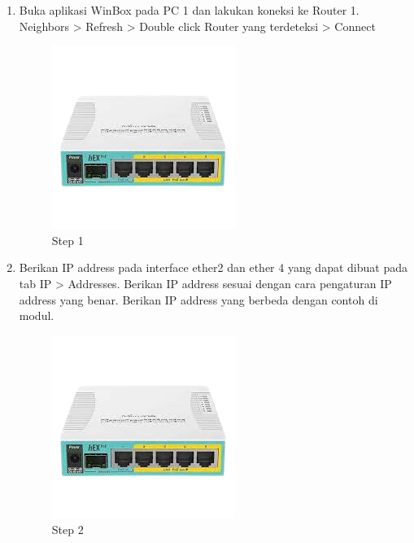 \begin{enumerate}
	\item Buka aplikasi WinBox pada PC 1 dan lakukan koneksi ke Router 1. Neighbors > Refresh >
	Double click Router yang terdeteksi > Connect
	\begin{figure}[H]
		\centering
		\includegraphics[width=0.5\linewidth]{P1/img/contoh.png}
		\caption{Step 1}
		\label{fig:gambar1}
	\end{figure}

	\item Berikan IP address pada interface ether2 dan ether 4 yang dapat dibuat pada tab IP > Addresses. Berikan IP address sesuai dengan cara pengaturan IP address yang benar. Berikan IP
	address yang berbeda dengan contoh di modul.
	\begin{figure}[H]
		\centering
		\includegraphics[width=0.5\linewidth]{P1/img/contoh.png}
		\caption{Step 2}
		\label{fig:gambar2}
	\end{figure}


\end{enumerate}
